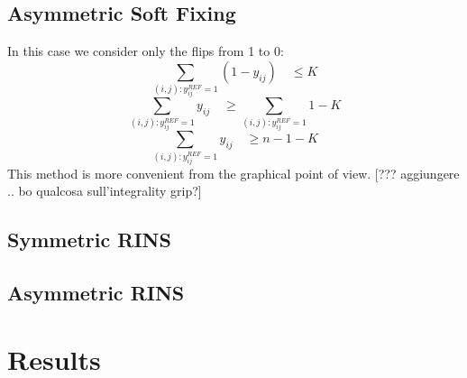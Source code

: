 \subsection{Asymmetric Soft Fixing}
In this case we consider only the flips from 1 to 0:
\[
	\sum_{(i,j):y^{REF}_{ij}=1} (1-y_{ij}) \quad \leq K
\]
\[
	\sum_{(i,j):y^{REF}_{ij}=1} y_{ij} \quad \geq \sum_{(i,j):y^{REF}_{ij}=1} 1 - K
\]
\[
	\sum_{(i,j):y^{REF}_{ij}=1} y_{ij} \quad \geq n - 1 - K
\]
This method is more convenient from the graphical point of view. 
[??? aggiungere .. bo qualcosa sull'integrality grip?]
\subsection{Symmetric RINS}

\subsection{Asymmetric RINS}

\section{Results}


